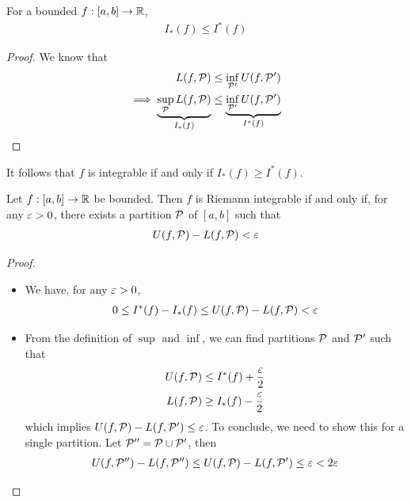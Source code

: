 \documentclass{../template/note}
\begin{document}
    \begin{lemma}
        For a bounded \(f: [a, b] \to \mathbb R\),
        \begin{align*}
            I_*(f) \leq I^*(f)
        \end{align*}
    \end{lemma}

    \begin{proof}
        We know that
        \begin{align*}
            L(f, \mathcal{P}) &\leq \inf_{\mathcal{P}'} U(f, \mathcal{P}') \\
            \implies \underbrace{\sup_{\mathcal{P}} L(f, \mathcal{P})}_{I_*(f)} &\leq \underbrace{\inf_{\mathcal{P}'} U(f, \mathcal{P}')}_{I^*(f)}
        \end{align*}
    \end{proof}
    
    \begin{remark*}
        It follows that \(f\) is integrable if and only if \(I_*(f) \geq I^*(f)\).
    \end{remark*}
    
    \begin{proposition}
        Let \(f: [a, b] \to \mathbb R\) be bounded. Then \(f\) is Riemann integrable if and only if, for any \(\varepsilon > 0\), there exists a partition \(\mathcal{P}\) of \([a, b]\) such that
        \begin{align*}
            U(f, \mathcal{P}) - L(f, \mathcal{P}) < \varepsilon
        \end{align*}
    \end{proposition}

    \begin{proof}
        \begin{itemize}
            \item[\(\impliedby\)] We have, for any \(\varepsilon > 0\),
            \begin{align*}
                0 \leq I^*(f) - I_*(f) \leq U(f, \mathcal{P}) - L(f, \mathcal{P}) < \varepsilon
            \end{align*}
            \item[\(\implies\)] From the definition of \(\sup\) and \(\inf\), we can find partitions \(\mathcal{P}\) and \(\mathcal{P}'\) such that
            \begin{align*}
                U(f, \mathcal{P}) &\leq I^*(f) + \frac{\varepsilon} 2 \\
                L(f, \mathcal{P}) &\geq I_*(f) - \frac{\varepsilon} 2
            \end{align*}
            which implies \(U(f, \mathcal{P}) - L(f, \mathcal{P}') \leq \varepsilon\). To conclude, we need to show this for a single partition. Let \(\mathcal{P}'' = \mathcal{P} \cup \mathcal{P}'\), then
            \begin{align*}
                U(f, \mathcal{P}'') - L(f, \mathcal{P}'') \leq U(f, \mathcal{P}) - L(f, \mathcal{P}') \leq \varepsilon < 2\varepsilon
            \end{align*}
        \end{itemize}
    \end{proof}
    
\end{document}
